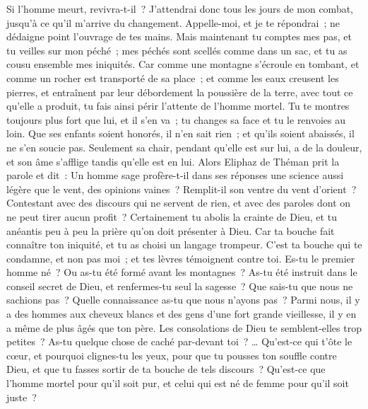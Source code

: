 \begin{multicols}{2}
Si l'homme meurt, revivra-t-il~? J'attendrai donc tous les jours de mon combat, jusqu'à ce qu'il m'arrive du changement.
 Appelle-moi, et je te répondrai~; ne dédaigne point l'ouvrage de tes mains.
Mais maintenant tu comptes mes pas, et tu veilles sur mon péché~;
mes péchés sont scellés comme dans un sac, et tu as cousu ensemble mes iniquités.
Car comme une montagne s'écroule en tombant, et comme un rocher est transporté de sa place~;
 et comme les eaux creusent les pierres, et entraînent par leur débordement la poussière de la terre, avec tout ce qu'elle a produit, tu fais ainsi périr l'attente de l'homme mortel.
Tu te montres toujours plus fort que lui, et il s'en va~; tu changes sa face et tu le renvoies au loin.
Que ses enfants soient honorés, il n'en sait rien~; et qu'ils soient abaissés, il ne s'en soucie pas.
Seulement sa chair, pendant qu'elle est sur lui, a de la douleur, et son âme s'afflige tandis qu'elle est en lui.
\VerseOne{}Alors Eliphaz de Théman prit la parole et dit~:
Un homme sage profère-t-il dans ses réponses une science aussi légère que le vent, des opinions vaines~? Remplit-il son ventre du vent d'orient~?
Contestant avec des discours qui ne servent de rien, et avec des paroles dont on ne peut tirer aucun profit~?
Certainement tu abolis la crainte de Dieu, et tu anéantis peu à peu la prière qu'on doit présenter à Dieu.
 Car ta bouche fait connaître ton iniquité, et tu as choisi un langage trompeur.
C'est ta bouche qui te condamne, et non pas moi~; et tes lèvres témoignent contre toi.
Es-tu le premier homme né~? Ou as-tu été formé avant les montagnes~?
As-tu été instruit dans le conseil secret de Dieu, et renfermes-tu seul la sagesse~?
Que sais-tu que nous ne sachions pas~? Quelle connaissance as-tu que nous n'ayons pas~?
Parmi nous, il y a des hommes aux cheveux blancs et des gens d'une fort grande vieillesse, il y en a même de plus âgés que ton père.
Les consolations de Dieu te semblent-elles trop petites~? As-tu quelque chose de caché par-devant toi~? …
Qu'est-ce qui t'ôte le cœur, et pourquoi clignes-tu les yeux,
pour que tu pousses ton souffle contre Dieu, et que tu fasses sortir de ta bouche de tels discours~?
Qu'est-ce que l'homme mortel pour qu'il soit pur, et celui qui est né de femme pour qu'il soit juste~?

\end{multicols}

